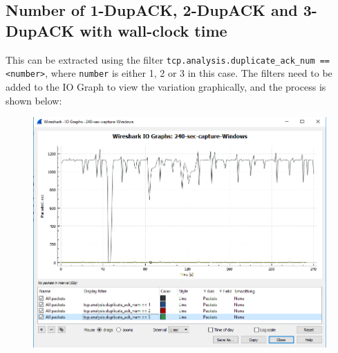 \documentclass{article}
\begin{document}
\subsection{Number of 1-DupACK, 2-DupACK and 3-DupACK with wall-clock time}
\begin{flushleft}
This can be extracted using the filter \texttt{tcp.analysis.duplicate\_ack\_num == <number>}, where \texttt{number} is either 1, 2 or 3 in this case. The filters need to be added to the IO Graph to view the variation graphically, and the process is shown below:
\begin{figure}[H]
\centering
\includegraphics[width=0.55\linewidth]{dup-ack-capture-process.png}
\end{figure}


\end{flushleft}
\end{document}
